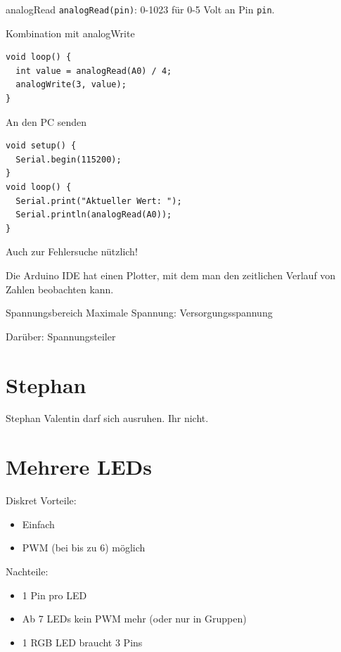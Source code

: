 \documentclass[bigger]{beamer}
\begin{document}
\begin{frame}[fragile,label={sec:org47b3170}]{analogRead}
 \texttt{analogRead(pin)}: 0-1023 für 0-5 Volt an Pin \texttt{pin}.
\end{frame}

\begin{frame}[fragile,label={sec:orgbda9128}]{Kombination mit analogWrite}
 \begin{verbatim}
void loop() {
  int value = analogRead(A0) / 4;
  analogWrite(3, value);
}
\end{verbatim}
\end{frame}

\begin{frame}[fragile,label={sec:org1ed9f6a}]{An den PC senden}
 \begin{verbatim}
void setup() {
  Serial.begin(115200);
}
void loop() {
  Serial.print("Aktueller Wert: ");
  Serial.println(analogRead(A0));
}
\end{verbatim}

Auch zur Fehlersuche nützlich!

Die Arduino IDE hat einen Plotter, mit dem man den zeitlichen Verlauf
von Zahlen beobachten kann.
\end{frame}

\begin{frame}[label={sec:org1649eac}]{Spannungsbereich}
Maximale Spannung: Versorgungsspannung
\pause

Darüber: Spannungsteiler
\end{frame}

\section{Stephan}
\label{sec:org90d8fde}
\begin{frame}[label={sec:org7274eb4}]{Stephan}
Valentin darf sich ausruhen. Ihr nicht.
\end{frame}

\section{Mehrere LEDs}
\label{sec:orgfdc0934}
\begin{frame}[label={sec:org83985ba}]{Diskret}
Vorteile:
\begin{itemize}
\item Einfach
\item PWM (bei bis zu 6) möglich
\end{itemize}

Nachteile:
\begin{itemize}
\item 1 Pin pro LED
\item Ab 7 LEDs kein PWM mehr (oder nur in Gruppen)
\item 1 RGB LED braucht 3 Pins
\end{itemize}
\end{frame}
\end{document}
